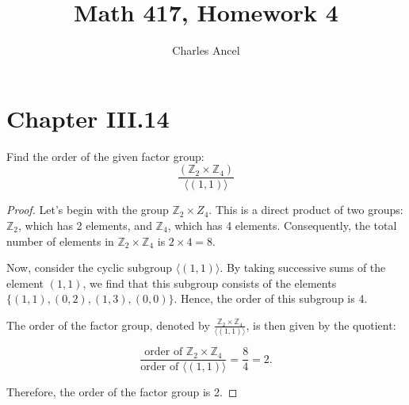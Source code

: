 \documentclass[12pt]{amsart}
\title{Math 417, Homework 4}
\author{Charles Ancel}
\theoremstyle{definition}
\numberwithin{equation}{section}
\theoremstyle{plain}
\newcommand{\Z}{\mathbb{Z}}
\begin{document}
\maketitle
\section*{Chapter III.14}

\begin{exercise}{5} Find the order of the given factor group:
    \[\frac{(\Z_2 \times \Z_4)}{\langle(1,1)\rangle}\]
    
    \begin{proof}
    Let's begin with the group \( \Z_2 \times Z_4 \). This is a direct product of two groups: \( \Z_2 \), which has 2 elements, and \( \Z_4 \), which has 4 elements. Consequently, the total number of elements in \( \Z_2 \times \Z_4 \) is \( 2 \times 4 = 8 \).
    
    Now, consider the cyclic subgroup \( \langle(1,1)\rangle \). By taking successive sums of the element \( (1,1) \), we find that this subgroup consists of the elements \( \{(1,1), (0,2), (1,3), (0,0)\} \). Hence, the order of this subgroup is 4.
    
    The order of the factor group, denoted by \( \frac{\Z_2 \times \Z_4}{\langle(1,1)\rangle} \), is then given by the quotient:
    
    \[
    \frac{\text{order of } \Z_2 \times \Z_4}{\text{order of } \langle(1,1)\rangle} = \frac{8}{4} = 2.
    \]
    
    Therefore, the order of the factor group is 2.
    \end{proof}
\end{exercise}
\vspace*{20pt}
\end{document}
